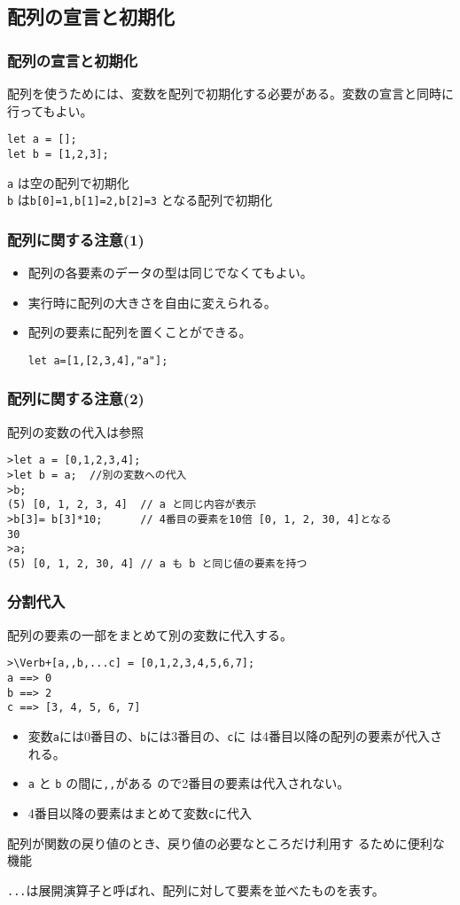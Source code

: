 \subsection{配列の宣言と初期化}
\begin{frame}[containsverbatim]
 \frametitle{配列の宣言と初期化}
配列を使うためには、変数を配列で初期化する必要がある。変数の宣言と同時に
行ってもよい。
\begin{Verbatim}
let a = [];
let b = [1,2,3];
\end{Verbatim}
 \Verb+a+ は空の配列で初期化\\
 \Verb+b+ は\Verb+b[0]=1,b[1]=2,b[2]=3+ となる配列で初期化
\end{frame}
\begin{frame}[containsverbatim]
 \frametitle{配列に関する注意(1)}
\begin{itemize}
 \item 配列の各要素のデータの型は同じでなくてもよい。
 \item 実行時に配列の大きさを自由に変えられる。
 \item 配列の要素に配列を置くことができる。
\begin{Verbatim}
let a=[1,[2,3,4],"a"];
\end{Verbatim}
\end{itemize}
\end{frame}
\begin{frame}[containsverbatim]
 \frametitle{配列に関する注意(2)}
配列の変数の代入は参照
\begin{Verbatim}
>let a = [0,1,2,3,4];
>let b = a;  //別の変数への代入
>b;
(5) [0, 1, 2, 3, 4]  // a と同じ内容が表示
>b[3]= b[3]*10;      // 4番目の要素を10倍 [0, 1, 2, 30, 4]となる
30
>a;
(5) [0, 1, 2, 30, 4] // a も b と同じ値の要素を持つ
\end{Verbatim}
\end{frame}
\begin{frame}[containsverbatim]
 \frametitle{分割代入}
 配列の要素の一部をまとめて別の変数に代入する。
\begin{Verbatim}
>\Verb+[a,,b,...c] = [0,1,2,3,4,5,6,7];
a ==> 0
b ==> 2
c ==> [3, 4, 5, 6, 7]
\end{Verbatim}
       \begin{itemize}
        \item  変数\Verb+a+には0番目の、\Verb+b+には3番目の、\Verb+c+に
               は4番目以降の配列の要素が代入される。
        \item \Verb+a+ と \Verb+b+ の間に\Verb+,,+がある
       ので2番目の要素は代入されない。
        \item 4番目以降の要素はまとめて変数\Verb+c+に代入
       \end{itemize}
 配列が関数の戻り値のとき、戻り値の必要なところだけ利用す
       るために便利な機能

 \Verb+...+は展開演算子と呼ばれ、配列に対して要素を並べたものを表す。
\end{frame}

